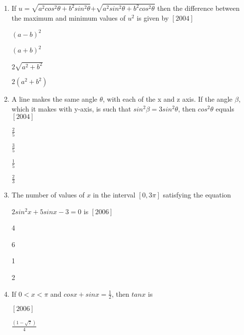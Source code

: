 \documentclass[journal,12pt,twocolumn]{IEEEtran}
\theoremstyle{remark}
\begin{document}
\begin{enumerate}[label={\arabic*}.]
\medskip
\item If $u=\sqrt{a^2 cos^2 \theta+b^2 sin^2 \theta}$$+$$\sqrt{a^2 sin^2 \theta+b^2 cos^2 \theta}$
then the difference between the  maximum and minimum values of $u^2$ is given by \hfill{$[2004]$}
\medskip
\begin{multicols}{2}

 $(a-b)^2$

 $(a+b)^2$
\columnbreak

 $2\sqrt{a^2 +b^2}$

 $2(a^2 +b^2)$

\end{multicols}

\medskip
 
\item A line makes the same angle $\theta$, with each of the x and z axis. 
If the angle $\beta$, which it makes with y-axis, is such that
$sin^2 \beta=3sin^2 \theta$, then $cos^2 \theta$ equals \hfill{$[2004]$}
\medskip

\begin{multicols}{2}

 $\frac{2}{5}$
\medskip

 $\frac{3}{5}$
\columnbreak

 $\frac{1}{5}$
\medskip

 $\frac{2}{3}$

\end{multicols}

\medskip

\item The number of values of $x$ in the interval $[0,3\pi]$ satisfying the equation 

$2sin^2 x+5sinx-3=0$ is \hfill{$[2006]$}

\medskip
\begin{multicols}{4}

 4
\columnbreak

 6
\columnbreak

 1
\columnbreak

 2

\end{multicols}
\medskip
\item If $0<x<\pi$ and $cosx+sinx=\frac{1}{2}$, then $tanx$ is 

\hfill{$[2006]$}
\begin{multicols}{2}

 $\frac{(1-\sqrt{7})}{4}$


\end{multicols}
\end{enumerate}
\end{document}
